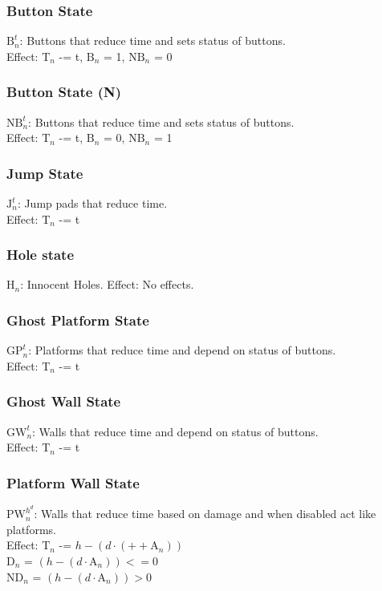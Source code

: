 \documentclass[10pt]{article}
\begin{document}
\subsubsection*{Button State}
$\text{B}_{n}^{t}$: Buttons that reduce time and sets status of buttons. \\
Effect: $\text{T}_{n}$ -= t, $\text{B}_{n}$ = 1, $\text{NB}_{n}$ = 0

\subsubsection*{Button State (N)}
$\text{NB}_{n}^{t}$: Buttons that reduce time and sets status of buttons. \\
Effect: $\text{T}_{n}$ -= t, $\text{B}_{n}$ = 0, $\text{NB}_{n}$ = 1

\subsubsection*{Jump State}
$\text{J}_{n}^{t}$: Jump pads that reduce time. \\
Effect: $\text{T}_{n}$ -= t

\subsubsection*{Hole state}
$\text{H}_{n}$: Innocent Holes.
Effect: No effects.

\subsubsection*{Ghost Platform State}
$\text{GP}_{n}^{t}$: Platforms that reduce time and depend on status of buttons. \\
Effect: $\text{T}_{n}$ -= t

\subsubsection*{Ghost Wall State}
$\text{GW}_{n}^{t}$: Walls that reduce time and depend on status of buttons. \\
Effect: $\text{T}_{n}$ -= t

\subsubsection*{Platform Wall State}
$\text{PW}_{n}^{h^{d}}$: Walls that reduce time based on damage and when disabled act like platforms. \\
Effect: $\text{T}_{n}$ -= $h - (d \cdot (++\text{A}_{n}))$ \\
$\text{D}_{n}$ = $(h - (d \cdot \text{A}_{n})) <= 0$ \\
$\text{ND}_{n}$ = $(h - (d \cdot \text{A}_{n})) > 0$
\end{document}
